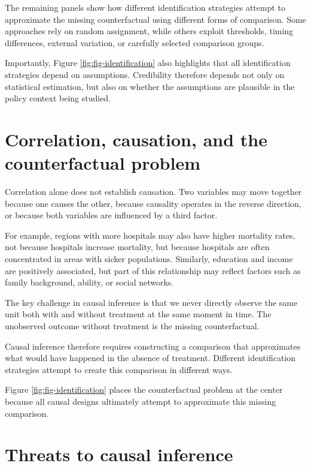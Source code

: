 \documentclass[
  11pt,
  oneside]{book}
\begin{document}
The remaining panels show how different identification strategies attempt to approximate the missing counterfactual using different forms of comparison. Some approaches rely on random assignment, while others exploit thresholds, timing differences, external variation, or carefully selected comparison groups.

Importantly, Figure \ref{fig:fig-identification} also highlights that all identification strategies depend on assumptions. Credibility therefore depends not only on statistical estimation, but also on whether the assumptions are plausible in the policy context being studied.

\section{Correlation, causation, and the counterfactual problem}\label{correlation-causation-and-the-counterfactual-problem}

Correlation alone does not establish causation. Two variables may move together because one causes the other, because causality operates in the reverse direction, or because both variables are influenced by a third factor.

For example, regions with more hospitals may also have higher mortality rates, not because hospitals increase mortality, but because hospitals are often concentrated in areas with sicker populations. Similarly, education and income are positively associated, but part of this relationship may reflect factors such as family background, ability, or social networks.

The key challenge in causal inference is that we never directly observe the same unit both with and without treatment at the same moment in time. The unobserved outcome without treatment is the missing counterfactual.

Causal inference therefore requires constructing a comparison that approximates what would have happened in the absence of treatment. Different identification strategies attempt to create this comparison in different ways.

Figure \ref{fig:fig-identification} places the counterfactual problem at the center because all causal designs ultimately attempt to approximate this missing comparison.

\section{Threats to causal inference}\label{threats-to-causal-inference}
\end{document}

